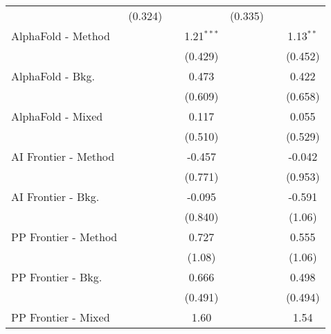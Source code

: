 \begin{tabular}{lcccccc}
                                  & (0.324)        &                &               & (0.335)       &                &   \\   
   AlphaFold - Method             &                &                & 1.21$^{***}$  &               &                & 1.13$^{**}$\\   
                                  &                &                & (0.429)       &               &                & (0.452)\\   
   AlphaFold - Bkg.               &                &                & 0.473         &               &                & 0.422\\   
                                  &                &                & (0.609)       &               &                & (0.658)\\   
   AlphaFold - Mixed              &                &                & 0.117         &               &                & 0.055\\   
                                  &                &                & (0.510)       &               &                & (0.529)\\   
   AI Frontier - Method           &                &                & -0.457        &               &                & -0.042\\   
                                  &                &                & (0.771)       &               &                & (0.953)\\   
   AI Frontier - Bkg.             &                &                & -0.095        &               &                & -0.591\\   
                                  &                &                & (0.840)       &               &                & (1.06)\\   
   PP Frontier - Method           &                &                & 0.727         &               &                & 0.555\\   
                                  &                &                & (1.08)        &               &                & (1.06)\\   
   PP Frontier - Bkg.             &                &                & 0.666         &               &                & 0.498\\   
                                  &                &                & (0.491)       &               &                & (0.494)\\   
   PP Frontier - Mixed            &                &                & 1.60          &               &                & 1.54\\   

\end{tabular}

